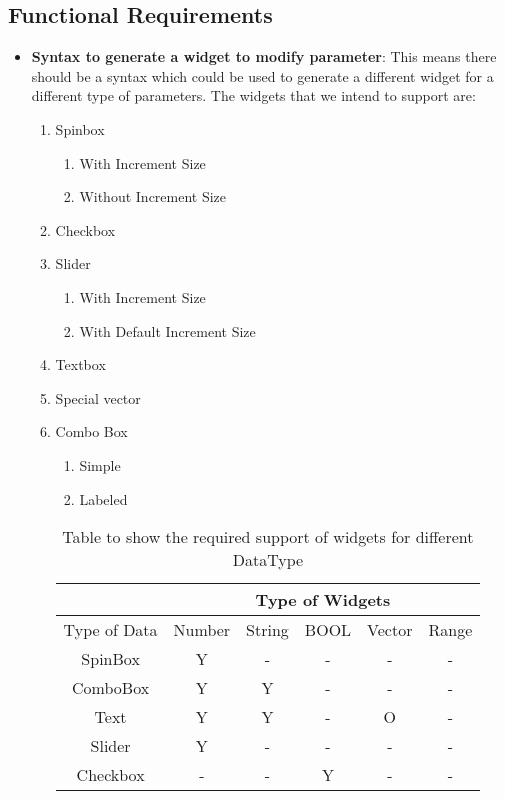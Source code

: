 \subsection{Functional Requirements}
\begin{itemize}
    \item {\bf Syntax to generate a widget to modify parameter}: This means there should be a syntax which could be used to generate a different widget for a different type of parameters.
    The widgets that we intend to support are:
    \begin{enumerate}
        \item Spinbox
            \begin{enumerate}
                \item With Increment Size
                \item Without Increment Size
            \end{enumerate}
        \item Checkbox
        \item Slider
            \begin{enumerate}
                \item With Increment Size
                \item With Default Increment Size
            \end{enumerate}
        \item Textbox
        \item Special vector
        \item Combo Box
            \begin{enumerate}
                \item Simple
                \item Labeled
            \end{enumerate}
   
    \begin{table}[h]
        \centering
        \begin{tabular}{ |c|c|c|c|c|c| }
            \hline
            & \multicolumn{5}{|c|}{Type of Widgets} \\
            \hline
            Type of Data&    Number&    String&    BOOL &Vector &Range     \\ [0.5ex]
            \hline
            SpinBox&Y&    -&    -&    -&    - \\ \hline
            ComboBox&    Y&    Y&    -&    -&    - \\ \hline
            Text&    Y&    Y&    -&    O&    - \\ \hline
            Slider&    Y&    -&    -&    -&    - \\ \hline
            Checkbox&    -&    -&    Y&    -&    - \\ [1ex]
            \hline
        \end{tabular}
        \caption{Table to show the required support of widgets for different DataType}
        \label{table2}
    \end{table}
   

\end{enumerate}
\end{itemize}
